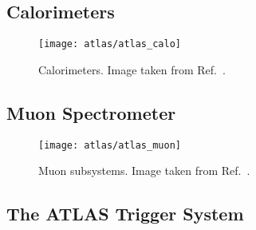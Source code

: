 \subsection{Calorimeters}

\begin{figure}[htbp]
  \centering

  \texttt{[image: atlas/atlas\_calo]}

  \caption{Calorimeters. Image taken from Ref.~\cite{Pequenao:1095927}.}%
  \label{fig:atlas_calorimeters}
\end{figure}


\subsection{Muon Spectrometer}

\begin{figure}[htbp]
  \centering

  \texttt{[image: atlas/atlas\_muon]}

  \caption{Muon subsystems. Image taken from Ref.~\cite{Pequenao:1095929}.}%
  \label{fig:atlas_muon_system}

\end{figure}

\subsection{The ATLAS Trigger System}

